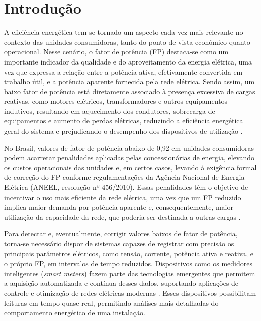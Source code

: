 \chapter{Introdução} \label{Introdução}
A eficiência energética tem se tornado um aspecto cada vez mais relevante no contexto das unidades consumidoras, tanto do ponto de vista econômico quanto operacional. Nesse cenário, o fator de potência (FP) destaca-se como um importante indicador da qualidade e do aproveitamento da energia elétrica, uma vez que expressa a relação entre a potência ativa, efetivamente convertida em trabalho útil, e a potência aparente fornecida pela rede elétrica. Sendo assim, um baixo fator de potência está diretamente associado à presença excessiva de cargas reativas, como motores elétricos, transformadores e outros equipamentos indutivos, resultando em aquecimento dos condutores, sobrecarga de equipamentos e aumento de perdas elétricas, reduzindo a eficiência energética geral do sistema e prejudicando o desempenho dos dispositivos de utilização \cite{TecnicasDeMelhoriasFP}.

No Brasil, valores de fator de potência abaixo de 0,92 em unidades consumidoras podem acarretar penalidades aplicadas pelas concessionárias de energia, elevando os custos operacionais das unidades e, em certos casos, levando à exigência formal de correção do FP conforme regulamentações da Agência Nacional de Energia Elétrica (ANEEL, resolução nº 456/2010). Essas penalidades têm o objetivo de incentivar o uso mais eficiente da rede elétrica, uma vez que um FP reduzido implica maior demanda por potência aparente e, consequentemente, maior utilização da capacidade da rede, que poderia ser destinada a outras cargas \cite{Baixofatordepotencia}.

Para detectar e, eventualmente, corrigir valores baixos de fator de potência, torna-se necessário dispor de sistemas capazes de registrar com precisão os principais parâmetros elétricos, como tensão, corrente, potência ativa e reativa, e o próprio FP, em intervalos de tempo reduzidos. Dispositivos como os medidores inteligentes (\textit{smart meters}) fazem parte das tecnologias emergentes que permitem a aquisição automatizada e contínua desses dados, suportando aplicações de controle e otimização de redes elétricas modernas \cite{MedidoresInteligentes}. Esses dispositivos possibilitam leituras em tempo quase real, permitindo análises mais detalhadas do comportamento energético de uma instalação.

